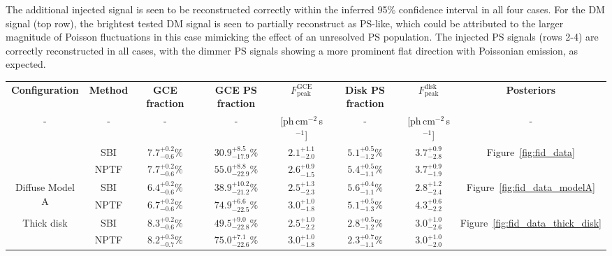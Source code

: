 \documentclass[prd,aps,10pt,nofootinbib,twocolumn,superscriptaddress,preprintnumbers,balancelastpage,longbibliography]{revtex4-1}
\newcommand\Tstrut{\rule{0pt}{2.6ex}}         %
\newcommand\Bstrut{\rule[-0.9ex]{0pt}{0pt}}   %
\begin{document}
The additional injected signal is seen to be reconstructed correctly within the inferred 95\% confidence interval in all four cases. For the DM signal (top row), the brightest tested DM signal is seen to partially reconstruct as PS-like, which could be attributed to the larger magnitude of Poisson fluctuations in this case mimicking the effect of an unresolved PS population. The injected PS signals (rows 2-4) are correctly reconstructed in all cases, with the dimmer PS signals showing a more prominent flat direction with Poissonian emission, as expected.

    
\begin{table}[tb]
    \footnotesize
    \begin{center}
    \begin{tabular}{cc|cccccc}
    \toprule
    \textbf{Configuration}  & \textbf{Method}  & \textbf{GCE fraction}	 & \textbf{GCE PS fraction}  & $F_{\mathrm{peak}}^\mathrm{GCE}$	&  \textbf{Disk PS fraction} &  $F_{\mathrm{peak}}^\mathrm{disk}$	&  \textbf{Posteriors}\Tstrut\Bstrut	\\   
    - & - & - & - & [ph\,cm$^{-2}$\,s$^{-1}$] & - & [ph\,cm$^{-2}$\,s$^{-1}$]	& -\Tstrut\Bstrut	\\   
    \Xhline{1\arrayrulewidth}
    \multirow{2}{*}{Fiducial} & SBI & $7.7^{+0.2}_{-0.6}\%$ & $30.9^{+8.5}_{-17.9}\%$ & $2.1^{+1.1}_{-2.0}$ & $5.1^{+0.5}_{-1.2}\%$ &  $3.7^{+0.9}_{-2.8}$ & \multirow{2}{*}{Figure~\ref{fig:fid_data}}\Tstrut \\
    & NPTF & $7.7^{+0.2}_{-0.6}\%$ & $55.0^{+8.8}_{-22.9}\%$ &  $2.6^{+0.9}_{-1.5}$ & $5.4^{+0.5}_{-1.1}\%$ & $3.7^{+0.9}_{-1.9}$\Bstrut &\\ 
    \hline
    \multirow{2}{*}{Diffuse Model A} & SBI & $6.4^{+0.2}_{-0.6}\%$  & $38.9^{+10.2}_{-21.2}\%$  & $2.5^{+1.3}_{-2.3}$ & $5.6^{+0.4}_{-1.1}\%$ & $2.8^{+1.2}_{-2.4}$ & \multirow{2}{*}{Figure~\ref{fig:fid_data_modelA}}\Tstrut  \\ 
     & NPTF & $6.7^{+0.2}_{-0.6}\%$ & $74.9^{+6.6}_{-22.5}\%$ & $3.0^{+1.0}_{-1.8}$ &  $5.1^{+0.5}_{-1.3}\%$ & $4.3^{+0.6}_{-2.2}$\Bstrut &\\
     \hline
    \multirow{2}{*}{Thick disk} & SBI & $8.3^{+0.2}_{-0.6}\%$ & $49.5^{+9.0}_{-22.8}\%$ & $2.5^{+1.0}_{-2.2}$ & $2.8^{+0.5}_{-1.2}\%$ &  $3.0^{+1.0}_{-2.6}$ & \multirow{2}{*}{Figure~\ref{fig:fid_data_thick_disk}}\Tstrut \\
     & NPTF & $8.2^{+0.3}_{-0.7}\%$ & $75.0^{+7.1}_{-22.6}\%$ & $3.0^{+1.0}_{-1.8}$ & $2.3^{+0.7}_{-1.1}\%$ & $3.0^{+1.0}_{-2.0}$\Bstrut &\\

\end{tabular}
\end{center}
\end{table}
\end{document}
